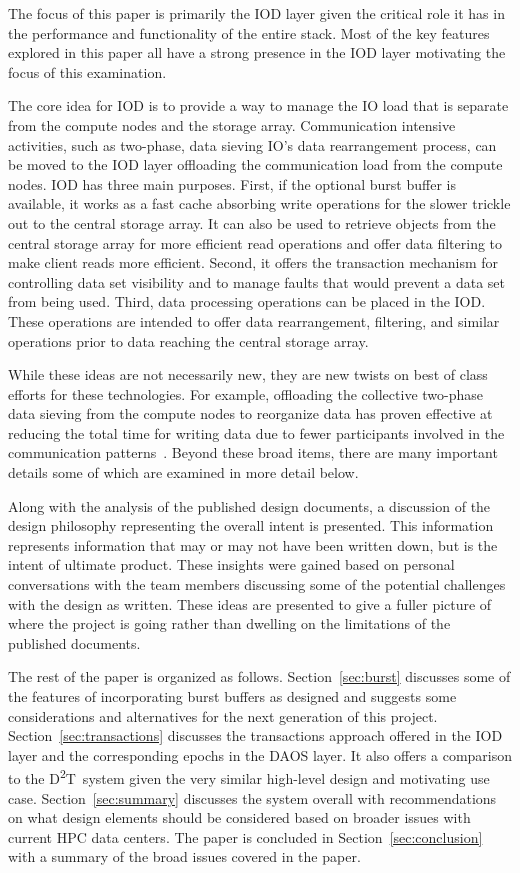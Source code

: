\documentclass[conference]{IEEEtran}
\newcommand{\DDT}{D\textsuperscript{2}T~}
\begin{document}
The focus of this paper is primarily the IOD layer given the critical role it
has in the performance and functionality of the entire stack. Most of the key
features explored in this paper all have a strong presence in the IOD layer
motivating the focus of this examination.

The core idea for IOD is to provide a way to manage the IO load that is
separate from the compute nodes and the storage array. Communication intensive
activities, such as two-phase, data sieving IO's data rearrangement process,
can be moved to the IOD layer offloading the communication load from the
compute nodes. IOD has three main purposes. First, if the optional burst buffer
is available, it works as a fast cache absorbing write operations for the
slower trickle out to the central storage array. It can also be used to
retrieve objects from the central storage array for more efficient read
operations and offer data filtering to make client reads more efficient.
Second, it offers the transaction mechanism for controlling data set visibility
and to manage faults that would prevent a data set from being used. Third, data
processing operations can be placed in the IOD. These operations are intended
to offer data rearrangement, filtering, and similar operations prior to data
reaching the central storage array.

While these ideas are not necessarily new, they are new twists on best of class
efforts for these technologies. For example, offloading the collective
two-phase data sieving from the compute nodes to reorganize data has proven
effective at reducing the total time for writing data due to fewer participants
involved in the communication patterns~\cite{lofstead:2011:nessie-staging}.
Beyond these broad items, there are many important details some of which are
examined in more detail below.

Along with the analysis of the published design documents, a discussion of the
design philosophy representing the overall intent is presented. This
information represents information that may or may not have been written down,
but is the intent of ultimate product. These insights were gained based on
personal conversations with the team members discussing some of the potential
challenges with the design as written. These ideas are presented to give a
fuller picture of where the project is going rather than dwelling on the
limitations of the published documents.

The rest of the paper is organized as follows. Section~\ref{sec:burst}
discusses some of the features of incorporating burst buffers as designed and
suggests some considerations and alternatives for the next generation of this
project. Section~\ref{sec:transactions} discusses the transactions approach
offered in the IOD layer and the corresponding epochs in the DAOS layer. It
also offers a comparison to the \DDT system given the very similar high-level
design and motivating use case.  Section~\ref{sec:summary} discusses the system
overall with recommendations on what design elements should be considered based
on broader issues with current HPC data centers. The paper is concluded in
Section~\ref{sec:conclusion} with a summary of the broad issues covered in the
paper.
\end{document}
